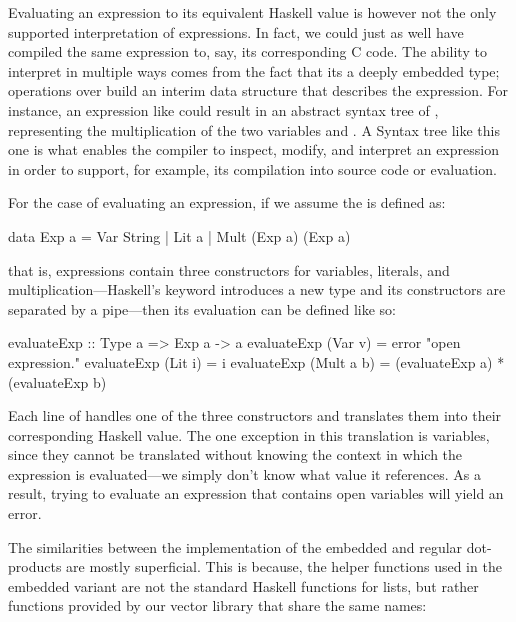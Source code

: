 \documentclass[../main.tex]{subfiles}
\begin{document}
Evaluating an expression to its equivalent Haskell value is however not the only supported interpretation of expressions. In fact, we could just as well have compiled the same expression to, say, its corresponding C code. The ability to interpret  in multiple ways comes from the fact that its a deeply embedded type; operations over  build an interim data structure that describes the expression. For instance, an expression like  could result in an abstract syntax tree of , representing the multiplication of the two variables  and . A Syntax tree like this one is what enables the compiler to inspect, modify, and interpret an expression in order to support, for example, its compilation into source code or evaluation.

For the case of evaluating an expression, if we assume the  is defined as:

\begin{code}
data Exp a = Var String | Lit a | Mult (Exp a) (Exp a)
\end{code}

\noindent that is, expressions contain three constructors for variables, literals, and multiplication---Haskell's  keyword introduces a new type and its constructors are separated by a pipe---then its evaluation can be defined like so:

\begin{code}
evaluateExp :: Type a => Exp a -> a
evaluateExp (Var v)    = error "open expression."
evaluateExp (Lit i)    = i
evaluateExp (Mult a b) = (evaluateExp a) * (evaluateExp b)
\end{code}

\noindent Each line of  handles one of the three constructors and translates them into their corresponding Haskell value. The one exception in this translation is variables, since they cannot be translated without knowing the context in which the expression is evaluated---we simply don't know what value it references. As a result, trying to evaluate an expression that contains open variables will yield an error.

The similarities between the implementation of the embedded and regular dot-products are mostly superficial. This is because, the helper functions used in the embedded variant are not the standard Haskell functions for lists, but rather functions provided by our vector library that share the same names:
\end{document}
